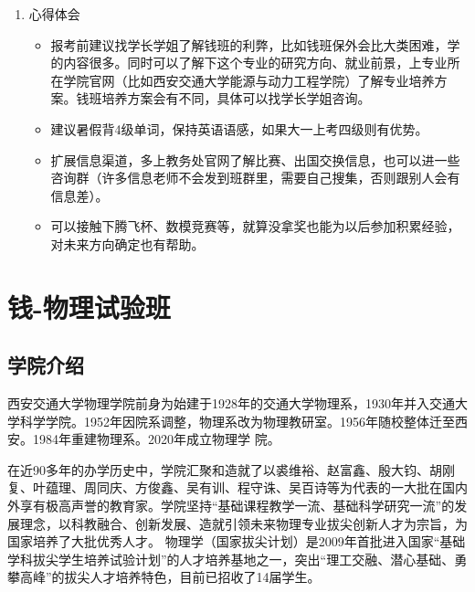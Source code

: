 \documentclass[zihao=-4,fontset=none]{Beautybook-CN}
\begin{document}
\begin{enumerate}
	\item 心得体会 
	      \begin{itemize}
	      	\item 报考前建议找学长学姐了解钱班的利弊，比如钱班保外会比大类困难，学的内容很多。同时可以了解下这个专业的研究方向、就业前景，上专业所在学院官网（比如西安交通大学能源与动力工程学院）了解专业培养方案。钱班培养方案会有不同，具体可以找学长学姐咨询。
	      	\item 建议暑假背4级单词，保持英语语感，如果大一上考四级则有优势。
	      	\item 扩展信息渠道，多上教务处官网了解比赛、出国交换信息，也可以进一些咨询群（许多信息老师不会发到班群里，需要自己搜集，否则跟别人会有信息差）。
	      	\item 可以接触下腾飞杯、数模竞赛等，就算没拿奖也能为以后参加积累经验，对未来方向确定也有帮助。
	      \end{itemize}
\end{enumerate}

\section{钱-物理试验班}

\subsection{学院介绍}
西安交通大学物理学院前身为始建于1928年的交通大学物理系，1930年并入交通大学科学学院。1952年因院系调整，物理系改为物理教研室。1956年随校整体迁至西安。1984年重建物理系。2020年成立物理学  院。

在近90多年的办学历史中，学院汇聚和造就了以裘维裕、赵富鑫、殷大钧、胡刚复、叶蕴理、周同庆、方俊鑫、吴有训、程守诛、吴百诗等为代表的一大批在国内外享有极高声誉的教育家。学院坚持“基础课程教学一流、基础科学研究一流”的发展理念，以科教融合、创新发展、造就引领未来物理专业拔尖创新人才为宗旨，为国家培养了大批优秀人才。 物理学（国家拔尖计划）是2009年首批进入国家“基础学科拔尖学生培养试验计划”的人才培养基地之一，突出“理工交融、潜心基础、勇攀高峰”的拔尖人才培养特色，目前已招收了14届学生。
\end{document}
